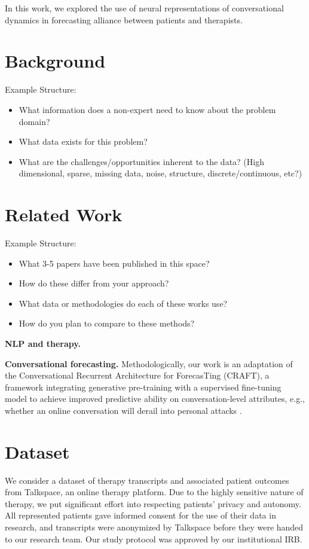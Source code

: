 \documentclass{article}
\begin{document}
In this work, we explored the use of neural representations of conversational dynamics in forecasting alliance between patients and therapists.

\section{Background}
Example Structure:
\begin{itemize}
\item What information does a non-expert need to know about the problem domain?
\item What data exists for this problem?
\item What are the challenges/opportunities inherent to the data? (High dimensional, sparse, missing data, noise, structure, discrete/continuous, etc?)
\end{itemize}


\section{Related Work}

Example Structure:
\begin{itemize}
\item What 3-5 papers have been published in this space?
\item How do these differ from your approach?
\item What data or methodologies do each of these works use?
\item How do you plan to compare to these methods?
\end{itemize}

\textbf{NLP and therapy.}

\textbf{Conversational forecasting.} Methodologically, our work is an adaptation of the Conversational Recurrent Architecture for ForecasTing (CRAFT), a framework integrating generative pre-training with a supervised fine-tuning model to achieve improved predictive ability on conversation-level attributes, e.g., whether an online conversation will derail into personal attacks \cite{Chang-Trouble:19}.


\section{Dataset}

We consider a dataset of therapy transcripts and associated patient outcomes from Talkspace, an online therapy platform. Due to the highly sensitive nature of therapy, we put significant effort into respecting patients' privacy and autonomy. All represented patients gave informed consent for the use of their data in research, and transcripts were anonymized by Talkspace before they were handed to our research team. Our study protocol was approved by our institutional IRB.
\end{document}

